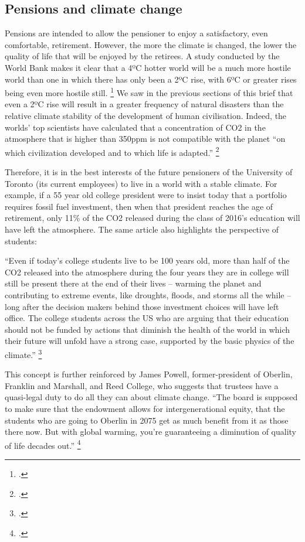 \subsection {Pensions and climate change}

Pensions are intended to allow the pensioner to enjoy a satisfactory, even comfortable, retirement.
However, the more the climate is changed, the lower the quality of life that will be enjoyed by the retirees.
A study conducted by the World Bank makes it clear that a 4ºC hotter world will be a much more hostile world than one in which there has only been a 2ºC rise, with 6ºC or greater rises being even more hostile still. \footcite{WorldBank4C}
We saw in the previous sections of this brief that even a 2ºC rise will result in a greater frequency of natural disasters than the relative climate stability of the development of human civilisation.
Indeed, the worlds' top scientists have calculated that a concentration of CO2 in the atmosphere that is higher than 350ppm is not compatible with the planet ``on which civilization developed and to which life is adapted.'' \footcite{TargetAtmosphere}

Therefore, it is in the best interests of the future pensioners of the University of Toronto (its current employees) to live in a world with a stable climate.
For example, if a 55 year old college president were to insist today that a portfolio requires fossil fuel investment, then when that president reaches the age of retirement,  only 11\% of the CO2 released during the class of 2016's education will have left the atmosphere.
The same article also highlights the perspective of students: 
\begin{slquote} ``Even if today’s college students live to be 100 years old, more than half of the CO2 released into the atmosphere during the four years they are in college will still be present there at the end of their lives – warming the planet and contributing to extreme events, like droughts, floods, and storms all the while – long after the decision makers behind those investment choices will have left office. The college students across the US who are arguing that their education should not be funded by actions that diminish the health of the world in which their future will unfold have a strong case, supported by the basic physics of the climate.'' \footcite{ClimateInteractivePersist}
\end{slquote}
This concept is further reinforced by James Powell, former-president of Oberlin, Franklin and Marshall, and Reed College, who suggests that trustees have a quasi-legal duty to do all they can about climate change.
``The board is supposed to make sure that the endowment allows for intergenerational equity, that the students who are going to Oberlin in 2075 get as much benefit from it as those there now. But with global warming, you're guaranteeing a diminution of quality of life decades out.'' \footcite{CaseForDivestment}

